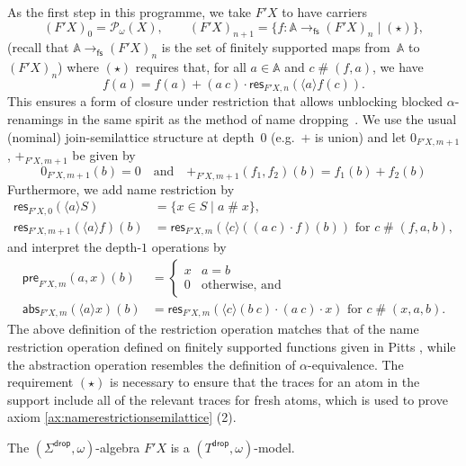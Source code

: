 \documentclass[a4paper,UKenglish,cleveref,thm-restate,numberwithinsect,final]{lipics-v2021}
\newcommand{\pre}{\mathsf{pre}}
\newcommand{\abs}{\mathsf{abs}}
\newcommand{\res}{\mathsf{res}}
\newcommand{\drop}{\mathsf{drop}}
\newcommand{\fs}{\mathsf{fs}}
\newcommand{\Names}{\mathbb{A}}
\newcommand{\pow}{\mathcal{P}}
\newcommand{\powf}{\pow_{\omega}}
\newcommand{\fresh}{\mathbin{\#}}
\newcommand{\bind}[1]{\langle #1\rangle}
\theoremstyle{plain}
\numberwithin{equation}{section}
\newcommand{\+}[1]{\mathcal{#1}\xspace}
\theoremstyle{definition}
\begin{document}
As the first step in this programme, we take $F'X$ to have carriers
\begin{equation*}
  (F' X)_0 = \powf(X), \qquad (F' X)_{n+1} = \{f \colon \Names \to_\fs (F' X)_n \mid (\star)\},
\end{equation*}
(recall that $\Names \to_\fs (F' X)_n$ is the set of finitely
supported maps from~$\Names$ to $(F'X)_n$) where $(\star)$ requires
that, for all $a \in \Names$ and $c \fresh (f,a)$, we have
\begin{equation}
  f(a) = f(a) + (a\ c) \cdot \res_{F' X, n}(\bind{a} f(c)). \label{eq:restriction}
\end{equation}
This ensures a form of closure under restriction that allows unblocking blocked $\alpha$-renamings in the same spirit as the method of name dropping~\cite{SchroderEA17}.
We use the usual (nominal) join-semilattice structure at depth~$0$ (e.g.~$+$ is union) and let $0_{F'X, m+1}$, $+_{F'X, m+1}$ be given by
\begin{equation*}
  0_{F'X, m+1}(b) = 0 \quad\text{and}\quad +_{F'X, m+1}(f_1, f_2)(b) = f_1(b) + f_2(b)
\end{equation*}
Furthermore, we add name restriction by
\begin{align*}
  \res_{F' X, 0}(\bind{a} S) &= \{x \in S \mid a \fresh x\}, \\
  \res_{F' X, m+1}(\bind{a} f)(b) &= \res_{F' X, m}(\bind{c} ((a\ c) \cdot f)(b)) \text{ for } c\fresh(f,a,b),
\end{align*}
and interpret the depth-$1$ operations by
\begin{align*}
  \pre_{F' X, m}(a, x)(b) & =
                            \begin{cases}
                              x & a = b\\
                              0 & \text{otherwise, and}
                            \end{cases}
  \\
  \abs_{F' X, m}(\bind{a} x)(b) & = \res_{F' X, m}(\bind{c} (b\ c) \cdot (a\ c) \cdot x) \text{ for } c\fresh(x,a,b).
\end{align*}
The above definition of the restriction operation matches that of the name restriction operation defined on finitely supported functions given in Pitts \cite{Pitts13}, while the abstraction operation resembles the definition of $\alpha$-equivalence.
The requirement $(\star)$ is necessary to ensure that the traces for an atom in the support include all of the relevant traces for fresh atoms, which is used to prove axiom \eqref{ax:namerestrictionsemilattice} (2).
\begin{lemma}\label{thm:semanticsmodelismodel}
  The $(\Sigma^\drop,\omega)$-algebra $F'X$ is a
  $(T^\drop,\omega)$-model.
\end{lemma}
\end{document}
